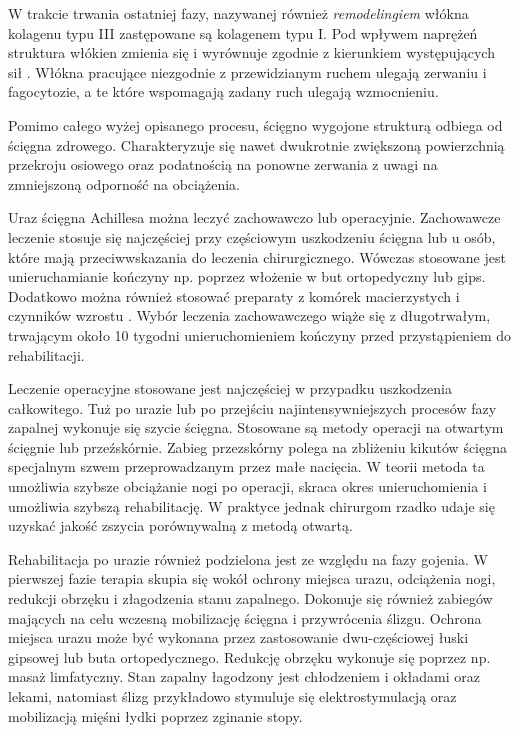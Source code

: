 W trakcie trwania ostatniej fazy, nazywanej również \textit{remodelingiem} włókna kolagenu typu III zastępowane są kolagenem typu I. Pod wpływem naprężeń struktura włókien zmienia się i wyrównuje zgodnie z kierunkiem występujących sił \cite{Yang2013}. Włókna pracujące niezgodnie z przewidzianym ruchem ulegają zerwaniu i fagocytozie, a te które wspomagają zadany ruch ulegają wzmocnieniu. 

Pomimo całego wyżej opisanego procesu, ścięgno wygojone strukturą odbiega od ścięgna zdrowego. Charakteryzuje się nawet dwukrotnie zwiększoną powierzchnią przekroju osiowego oraz podatnością na ponowne zerwania z uwagi na zmniejszoną odporność na obciążenia. 

Uraz ścięgna Achillesa można leczyć zachowawczo lub operacyjnie. Zachowawcze leczenie stosuje się najczęściej przy częściowym uszkodzeniu ścięgna lub u osób, które mają przeciwwskazania do leczenia chirurgicznego. Wówczas stosowane jest unieruchamianie kończyny np. poprzez włożenie w but ortopedyczny lub gips. Dodatkowo można również stosować preparaty z komórek macierzystych i czynników wzrostu \cite{CMC}. Wybór leczenia zachowawczego wiąże się z długotrwałym, trwającym około 10 tygodni unieruchomieniem kończyny przed przystąpieniem do rehabilitacji.

Leczenie operacyjne stosowane jest najczęściej w przypadku uszkodzenia całkowitego. Tuż po urazie lub po przejściu najintensywniejszych procesów fazy zapalnej wykonuje się szycie ścięgna. Stosowane są metody operacji na otwartym ścięgnie lub przeźskórnie. Zabieg przezskórny polega na zbliżeniu kikutów ścięgna specjalnym szwem przeprowadzanym przez małe nacięcia. W teorii metoda ta umożliwia szybsze obciążanie nogi po operacji, skraca okres unieruchomienia i umożliwia szybszą rehabilitację. W praktyce jednak chirurgom rzadko udaje się uzyskać jakość zszycia porównywalną z metodą otwartą. 

Rehabilitacja po urazie również podzielona jest ze względu na fazy gojenia. W pierwszej fazie terapia skupia się wokół ochrony miejsca urazu, odciążenia nogi, redukcji obrzęku i złagodzenia stanu zapalnego. Dokonuje się również zabiegów mających na celu wczesną mobilizację ścięgna i przywrócenia ślizgu. Ochrona miejsca urazu może być wykonana przez zastosowanie dwu-częściowej łuski gipsowej lub buta ortopedycznego. Redukcję obrzęku wykonuje się poprzez np. masaż limfatyczny. Stan zapalny łagodzony jest chłodzeniem i okładami oraz lekami, natomiast ślizg przykładowo stymuluje się elektrostymulacją oraz mobilizacją mięśni łydki poprzez zginanie stopy.

